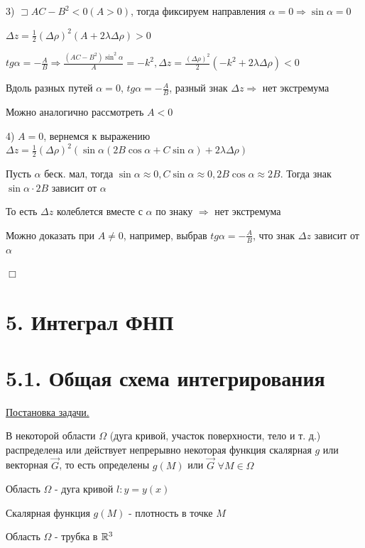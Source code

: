 \documentclass[12pt]{article}
\begin{document}
    3) $\sqsupset AC - B^2 < 0 (A > 0)$, тогда фиксируем направления $\alpha = 0 \Longrightarrow \sin\alpha = 0$

    $\Delta z = \frac{1}{2}(\Delta \rho)^2 (A + 2\lambda\Delta\rho) > 0$

    $tg \alpha = -\frac{A}{B} \Longrightarrow \frac{(AC - B^2)\sin^2\alpha}{A} = -k^2, \Delta z = \frac{(\Delta \rho)^2}{2}(-k^2 + 2\lambda\Delta\rho) < 0$

    Вдоль разных путей $\alpha = 0$, $tg \alpha = -\frac{A}{B}$, разный знак $\Delta z \Longrightarrow$ нет экстремума

    \Nota Можно аналогично рассмотреть $A < 0$

    4) $A = 0$, вернемся к выражению $\Delta z = \frac{1}{2} (\Delta \rho)^2 (\sin\alpha(2B\cos\alpha + C\sin\alpha) + 2\lambda\Delta\rho)$

    Пусть $\alpha$ беск. мал, тогда $\sin\alpha \approx 0, C\sin\alpha \approx 0, 2B\cos\alpha \approx 2B$. Тогда знак $\sin\alpha \cdot 2B$ зависит от $\alpha$

    То есть $\Delta z$ колеблется вместе с $\alpha$ по знаку $\Longrightarrow$ нет экстремума

    Можно доказать при $A \neq 0$, например, выбрав $tg \alpha = -\frac{A}{B}$, что знак $\Delta z$ зависит от $\alpha$

    $\Box$



    \clearpage


    \section{5. Интеграл ФНП}


    \section{5.1. Общая схема интегрирования}

    \underline{Постановка задачи.}

    В некоторой области $\Omega$ (дуга кривой, участок поверхности, тело и т. д.)
    распределена или действует непрерывно некоторая функция скалярная $g$ или векторная $\overrightarrow{G}$,
    то есть определены $g(M)$ или $\overrightarrow{G}$ $\forall M \in \Omega$

    \Ex Область $\Omega$ - дуга кривой $l : y = y(x)$

    Скалярная функция $g(M)$ - плотность в точке $M$

    \Ex Область $\Omega$ - трубка в $\mathbb{R}^3$
\end{document}
